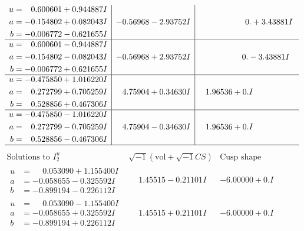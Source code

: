 \documentclass[1p]{elsarticle_modified}
\theoremstyle{definition}
\newcommand{\I}{\sqrt{-1}}
\begin{document}
$$\begin{array}{c|c|c}
\begin{aligned}
u &= \phantom{-}0.600601 + 0.944887 I \\
a &= -0.154802 + 0.082043 I \\
b &= -0.006772 - 0.621655 I\end{aligned}
 & -0.56968 - 2.93752 I & \phantom{-0.000000 -}0. + 3.43881 I \\ \hline\begin{aligned}
u &= \phantom{-}0.600601 - 0.944887 I \\
a &= -0.154802 - 0.082043 I \\
b &= -0.006772 + 0.621655 I\end{aligned}
 & -0.56968 + 2.93752 I & \phantom{-0.000000 } 0. - 3.43881 I \\ \hline\begin{aligned}
u &= -0.475850 + 1.016220 I \\
a &= \phantom{-}0.272799 + 0.705259 I \\
b &= \phantom{-}0.528856 + 0.467306 I\end{aligned}
 & \phantom{-}4.75904 + 0.34630 I & \phantom{-}1.96536 + 0. I\phantom{ +0.000000I} \\ \hline\begin{aligned}
u &= -0.475850 - 1.016220 I \\
a &= \phantom{-}0.272799 - 0.705259 I \\
b &= \phantom{-}0.528856 - 0.467306 I\end{aligned}
 & \phantom{-}4.75904 - 0.34630 I & \phantom{-}1.96536 + 0. I\phantom{ +0.000000I}\\
 \hline 
 \end{array}$$\newpage$$\begin{array}{c|c|c}  
\text{Solutions to }I^u_{2}& \I (\text{vol} + \sqrt{-1}CS) & \text{Cusp shape}\\
 \hline 
\begin{aligned}
u &= \phantom{-}0.053090 + 1.155400 I \\
a &= -0.058655 - 0.325592 I \\
b &= -0.899194 - 0.226112 I\end{aligned}
 & \phantom{-}1.45515 - 0.21101 I & -6.00000 + 0. I\phantom{ +0.000000I} \\ \hline\begin{aligned}
u &= \phantom{-}0.053090 - 1.155400 I \\
a &= -0.058655 + 0.325592 I \\
b &= -0.899194 + 0.226112 I\end{aligned}
 & \phantom{-}1.45515 + 0.21101 I & -6.00000 + 0. I\phantom{ +0.000000I} \\ \hline\begin{aligned}

\end{aligned}
\end{array}$$
\end{document}
